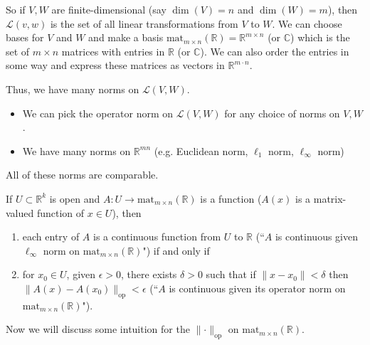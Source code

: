 So if \(V, W\) are finite-dimensional (say \(\dim(V) = n\) and \(\dim(W) = m\)), then \(\mathcal{L}(v, w) \) is the set of all linear transformations from \(V\) to \(W\). We can choose bases for \(V\) and \(W\) and make a basis \(\text{mat}_{m \times n} (\mathbb{R}) = \mathbb{R}^{m \times n}\) (or \(\mathbb{C}\)) which is the set of \(m \times n\) matrices with entries in \(\mathbb{R}\) (or \(\mathbb{C}\)). We can also order the entries in some way and express these matrices as vectors in \(\mathbb{R}^{m  \cdot n}\).

Thus, we have many norms on \(\mathcal{L}(V, W)\). 

\begin{itemize}

\item We can pick the operator norm on \(\mathcal{L}(V, W)\) for any choice of norms on \(V, W\).

\item We have many norms on \(\mathbb{R}^{mn}\) (e.g. Euclidean norm, \(\ell_1\) norm, \(\ell_\infty\) norm)

\end{itemize}

All of these norms are comparable.

\begin{corollary}\label{ra.cor.cont.op}

If \(U \subset \mathbb{R}^k\) is open and \(A: U \to \text{mat}_{m \times n} (\mathbb{R})\) is a function (\(A(x)\) is a matrix-valued function of \(x \in U\)), then 

\begin{enumerate}

\item each entry of \(A\) is a continuous function from \(U\) to \(\mathbb{R}\) (``\(A\) is continuous given \(\ell_\infty\) norm on \(\text{mat}_{m \times n} (\mathbb{R})\)") if and only if

\item for \(x_0 \in U\), given \(\epsilon > 0\), there exists \(\delta > 0\) such that if \(\lVert x - x_0 \rVert < \delta\) then \(\lVert A(x) - A(x_0) \rVert_{\text{op}} < \epsilon\) (``\(A\) is continuous given its operator norm on \(\text{mat}_{m \times n} (\mathbb{R})\)").

\end{enumerate}

\end{corollary}

Now we will discuss some intuition for the \(\lVert \cdot \rVert_\text{op}\) on \(\text{mat}_{m \times n} (\mathbb{R})\).

